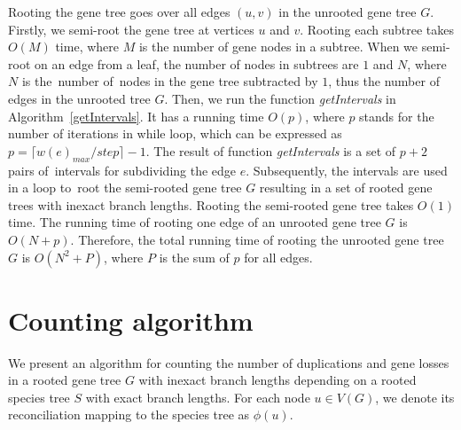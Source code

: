 Rooting the gene tree goes over all edges $(u, v)$ in the unrooted gene tree $G$. Firstly, we semi-root the gene tree at vertices $u$ and $v$. Rooting each subtree takes $O(M)$ time, where $M$ is the number of gene nodes in a subtree. When we semi-root on an edge from a leaf, the number of nodes in subtrees are $1$ and $N$, where $N$ is the~number of~nodes in the gene tree subtracted by $1$, thus the number of edges in the unrooted tree $G$. Then, we run the function \emph{getIntervals} in Algorithm~\ref{getIntervals}. It has a running time $O(p)$, where $p$ stands for the number of iterations in while loop, which can be expressed as $p = \lceil w(e)_{max}/step\rceil - 1$. The result of function \emph{getIntervals} is a set of $p+2$ pairs of~intervals for subdividing the edge $e$. Subsequently, the intervals are used in a loop to~root the semi-rooted gene tree $G$ resulting in a set of rooted gene trees with inexact branch lengths. Rooting the semi-rooted gene tree takes $O(1)$ time. The running time of rooting one edge of an unrooted gene tree $G$ is $O(N + p)$. Therefore, the total running time of rooting the unrooted gene tree $G$ is $O(N^2 + P)$, where $P$ is the sum of $p$ for all edges.


\section{Counting algorithm} \label{counting_algorithm}

We present an algorithm for counting the number of duplications and gene losses in a rooted gene tree $G$ with inexact branch lengths depending on a rooted species tree $S$ with exact branch lengths. For each node $u \in V(G)$, we denote its reconciliation mapping to the species tree as $\phi(u)$.

